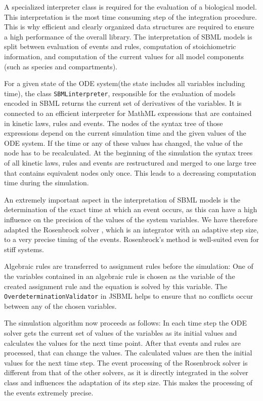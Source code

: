\documentclass{bioinfo}
\newcommand{\OverdeterminationValidator}{\texttt{Overdetermination\-Validator}}
\newcommand{\SBMLinterpreter}{\texttt{SBML\-interpreter}}
\begin{document}
\begin{methods}
A specialized interpreter class is required for the evaluation of a biological model. This interpretation is the most time consuming step of the integration procedure.
This is why efficient and clearly organized data structures are required to
ensure a high performance of the overall library. The interpretation of SBML
models is split between evaluation of events and rules, computation of stoichiometric information, and computation of the current
values for all model components (such as species and compartments).

For a given state of the ODE system\marginpar(the state includes all variables including time), the class \SBMLinterpreter, responsible for the evaluation of models encoded in SBML returns the current set of
derivatives of the variables. It is connected to an efficient
interpreter for MathML expressions that are contained in kinetic laws, rules
and events. The nodes of the syntax tree of those expressions depend on the
current simulation time and the given values of the ODE system. If the time or
any of these values has changed, the value of the node has to be recalculated.
At the beginning of the simulation the syntax trees of all kinetic laws, rules
and events are restructured and merged to one large tree that contains
equivalent nodes only once. This leads to a decreasing computation time during
the simulation.

An extremely important aspect in the interpretation of SBML models is the
determination of the exact time at which an event occurs, as this can have a
high influence on the precision of the values of the system variables. We have
therefore adapted the Rosenbrock solver \citep{Kotcon2011}, which is an
integrator with an adaptive step size, to a very precise timing of the events.
Rosenbrock's method is well-suited even for stiff systems.

Algebraic rules are transferred to assignment rules before the simulation: One
of the variables contained in an algebraic rule is chosen as the variable of the
created assignment rule and the equation is solved by this variable. The
\OverdeterminationValidator{} in JSBML helps to ensure that no conflicts occur
between any of the chosen variables.

The simulation algorithm now proceeds as follows: In each time step the ODE
solver gets the current set of values of the variables as its initial values and
calculates the values for the next time point. After that events
and rules are processed, that can change the values. The calculated values are
then the initial values for the next time step. The event processing of the
Rosenbrock solver is different from that of the other solvers, as it
is directly integrated in the solver class and influences the adaptation of its
step size. This makes the processing of the events extremely precise.
\end{methods}
\end{document}
